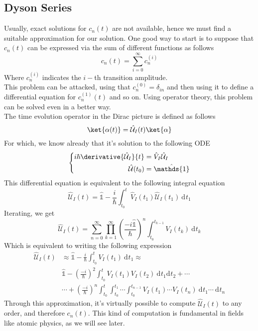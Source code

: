 \documentclass[a4paper, 11pt]{book}
\newcommand{\1}{\opr{\mathds{1}}}
\newcommand{\diff}[2][]{\ \mathrm{d}^{#1}#2}
\newcommand{\ddiff}[3][]{\ \mathrm{d}^{#1}#2\mathrm{d}^{#1}#3}
\newcommand{\opr}[1]{\hat{#1}}
\newcommand{\U}{\opr{\mathcal{U}}}
\newcommand{\kd}[1]{\delta_{#1}}
\theoremstyle{plain}
\begin{document}
	\subsection{Dyson Series}
	Usually, exact solutions for $c_n(t)$ are not available, hence we must find a suitable approximation for our solution. One good way to start is to suppose that $c_n(t)$ can be expressed via the sum of different functions as follows
	\begin{equation*}
		c_n(t)=\sum_{i=0}^{\infty}c_n^{(i)}
	\end{equation*}
	Where $c_n^{(i)}$ indicates the $i-$th transition amplitude.\\
	This problem can be attacked, using that $c_n^{(0)}=\kd{in}$ and then using it to define a differential equation for $c_n^{(1)}(t)$ and so on. Using operator theory, this problem can be solved even in a better way.\\
	The time evolution operator in the Dirac picture is defined as follows
	\begin{equation*}
		\ket{\alpha(t)}=\U_I(t)\ket{\alpha}
	\end{equation*}
	For which, we know already that it's solution to the following ODE
	\begin{equation*}
		\left\{\begin{aligned}
			i\hbar\derivative{\U_I}{t}&=\opr{V}_I\U_I\\
			\U(t_0)&=\1
		\end{aligned}\right.
	\end{equation*}
	This differential equation is equivalent to the following integral equation
	\begin{equation*}
		\U_I(t)=\1-\frac{i}{\hbar}\int_{t_0}^{t}\opr{V}_I(t_1)\U_I(t_1)\diff{t}_1
	\end{equation*}
	Iterating, we get
	\begin{equation}
		\U_I(t)=\sum_{n=0}^{\infty}\prod_{k=1}^{\infty}\left( \frac{-i\1}{\hbar} \right)^n\int_{t_0}^{t_{k-1}}V_I(t_k)\diff{t}_k
		\label{eq:dysonseries}
	\end{equation}
	Which is equivalent to writing the following expression
	\begin{equation*}
		\begin{aligned}
		\U_I(t)&\approx\1-\frac{i}{\hbar}\int_{t_0}^{t}V_I(t_1)\diff{t}_1\approx\\
		&\1-\left( \frac{-i}{\hbar} \right)^2\int_{t_0}^{t}V_I(t_1)V_I(t_2)\ddiff{t_1}{t_2}+\cdots\\
		&\cdots+\left( \frac{-i}{\hbar} \right)^n\int_{t_0}^{t}\int_{t_0}^{t_1}\cdots\int_{t_0}^{t_{n-1}}V_I(t_1)\cdots V_I(t_n)\diff{t_1}\cdots\diff{t_n}
	\end{aligned}
	\end{equation*}
	Through this approximation, it's virtually possible to compute $\U_I(t)$ to any order, and therefore $c_n(t)$. This kind of computation is fundamental in fields like atomic physics, as we will see later.
\end{document}
